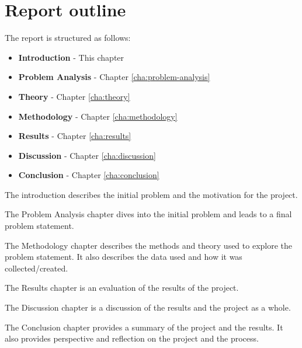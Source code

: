 \section{Report outline}\label{sec:report-outline}
The report is structured as follows:

\begin{itemize}
  \item \textbf{Introduction} - This chapter
  \item \textbf{Problem Analysis} - Chapter \ref{cha:problem-analysis}
  \item \textbf{Theory} - Chapter \ref{cha:theory}
  \item \textbf{Methodology} - Chapter \ref{cha:methodology}
  \item \textbf{Results} - Chapter \ref{cha:results}
  \item \textbf{Discussion} - Chapter \ref{cha:discussion}
  \item \textbf{Conclusion} - Chapter \ref{cha:conclusion}
\end{itemize}

The introduction describes the initial problem and the motivation for the project.

The Problem Analysis chapter dives into the initial problem and leads to a final problem statement.

The Methodology chapter describes the methods and theory used to explore the problem statement. It also describes the data used and how it was collected/created.

The Results chapter is an evaluation of the results of the project.

The Discussion chapter is a discussion of the results and the project as a whole.

The Conclusion chapter provides a summary of the project and the results. It also provides perspective and reflection on the project and the process.